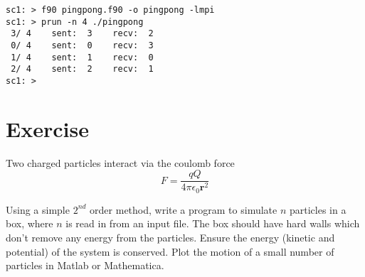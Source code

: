 \documentclass[12pt,a4paper,oneside,openany]{report}
\newcommand{\code}[1]{\texttt{#1}}
\newcommand{\makefile}{\code{Makefile}}
\begin{document}
\small
\begin{verbatim}
sc1: > f90 pingpong.f90 -o pingpong -lmpi
sc1: > prun -n 4 ./pingpong
 3/ 4    sent:  3    recv:  2
 0/ 4    sent:  0    recv:  3
 1/ 4    sent:  1    recv:  0
 2/ 4    sent:  2    recv:  1
sc1: > 
\end{verbatim}
\normalsize

\newpage

\section*{Exercise}
Two charged particles interact via the coulomb force
\begin{equation}
F=\frac{q Q}{4\pi\epsilon_{0} \mathbf{r}^{2}}
\end{equation}

Using a simple $2^{nd}$ order method, write a program to simulate $n$ particles in a box, where $n$ is read in from an input file.  The box should have hard walls which don't remove any energy from the particles.  Ensure the energy (kinetic and potential) of the system is conserved.  Plot the motion of a small number of particles in Matlab or Mathematica.









\end{document}
